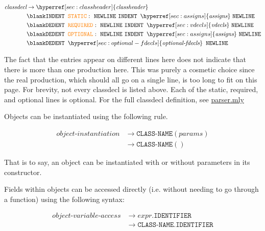 \documentclass{article}
\begin{document}
\label{sec:classdecl}
\begin{align*}
    \textit{classdecl} &\to \hyperref[sec:classheader]{\textit{classheader}} \text{ } \\
    &\blank \texttt{INDENT} \texttt{ } \textcolor{orange}{\texttt{STATIC}}: \text{ } \texttt{NEWLINE}  \text{ } \texttt{INDENT} \texttt{ } \hyperref[sec:assigns]{\textit{assigns}} \text{ } \texttt{NEWLINE} \text{ } \\
    &\blank
    \texttt{DEDENT} \texttt{ } \textcolor{orange}{\texttt{REQUIRED}}: \text{ } \texttt{NEWLINE} \text{ } \texttt{INDENT} \texttt{ }  \hyperref[sec:vdecls]{\textit{vdecls}} \text{ } \texttt{NEWLINE} \text{ } \\
    &\blank \texttt{DEDENT} \texttt{ } \textcolor{orange}{\texttt{OPTIONAL}}: \text{ }  \texttt{NEWLINE} \text{ } \texttt{INDENT} \texttt{ } \hyperref[sec:assigns]{\textit{assigns}} \text{ } \texttt{NEWLINE} \\
    &\blank \texttt{DEDENT} \texttt{ } \hyperref[sec:optional-fdecls]{\textit{optional-fdecls}} \texttt{ } \texttt{NEWLINE}
\end{align*}

The fact that the entries appear on different lines here does not indicate that there is more than one production here. This was purely a cosmetic choice since the real production, which should all go on a single line, is too long to fit on this page. For brevity, not every classdecl is listed above. Each of the static, required, and optional lines is optional. For the full classdecl definition, see \hyperref[sec:parsermly]{parser.mly}

Objects can be instantiated using the following rule.

\label{sec:object-instantiation}
\begin{align*}
    \textit{object-instantiation} &\to \texttt{CLASS-NAME}(\hyperref[sec:params]{\textit{params}}) \\
    &\to \texttt{CLASS-NAME}()
\end{align*}

That is to say, an object can be instantiated with or without parameters in its constructor.

Fields within objects can be accessed directly (i.e. without needing to go through a function) using the following syntax:

\label{sec:object-variable-access}
\begin{align*}
    \textit{object-variable-access} &\to \hyperref[sec:expr]{\textit{expr}}.\texttt{IDENTIFIER} \\
    &\to \texttt{CLASS-NAME}.\texttt{IDENTIFIER}
\end{align*}
\end{document}
